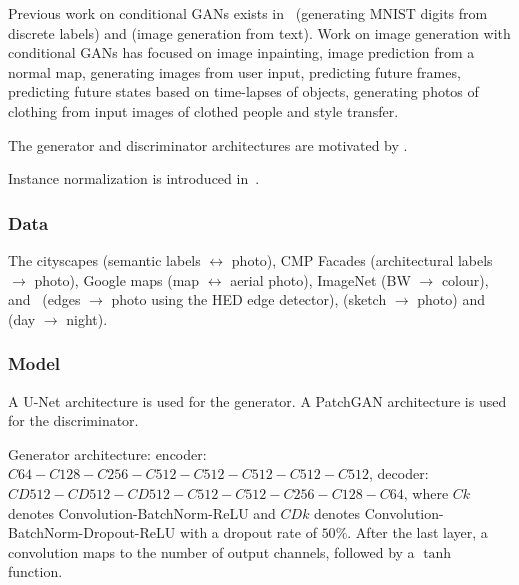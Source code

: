 \documentclass[a4paper, 12pt]{article}
\begin{document}
Previous work on conditional GANs exists in~\citet{DBLP:journals/corr/MirzaO14}
(generating MNIST digits from discrete labels) and
\citet{DBLP:journals/corr/ReedAYLSL16} (image generation from text). Work on
image generation with conditional GANs has focused on image
inpainting\citet{DBLP:journals/corr/PathakKDDE16}, image prediction from a
normal map\citet{DBLP:journals/corr/WangG16}, generating images from user
input\citet{DBLP:journals/corr/WangG16}, predicting future
frames\citet{DBLP:journals/corr/MathieuCL15}, predicting future states based on
time-lapses of objects\citet{DBLP:journals/corr/ZhouB16b}, generating photos of
clothing from input images of clothed people\citet{DBLP:journals/corr/YooKPPK16}
and style transfer\citet{DBLP:journals/corr/LiW16b}.

The generator and discriminator architectures are motivated by
\citet{DBLP:journals/corr/RadfordMC15}.

Instance normalization is introduced in~\citet{DBLP:journals/corr/UlyanovVL16}.

\subsubsection{Data}

The cityscapes\citet{Cordts_2016_CVPR} (semantic labels $\leftrightarrow$
photo), CMP Facades (architectural labels $\rightarrow$ photo), Google maps
(map $\leftrightarrow$ aerial photo),
ImageNet\citet{DBLP:journals/corr/RussakovskyDSKSMHKKBBF14} (BW $\rightarrow$
colour), \citet{zhu2016generative} and~\citet{fine-grained} (edges
$\rightarrow$ photo using the HED edge
detector\citet{DBLP:journals/corr/XieT15}),
\citet{Eitz:2012:HSO:2185520.2185540} (sketch $\rightarrow$ photo) and
\citet{Laffont14} (day $\rightarrow$ night).

\subsubsection{Model}

A U-Net\citet{DBLP:journals/corr/RonnebergerFB15} architecture is used for the
generator. A PatchGAN architecture\citet{DBLP:journals/corr/LiW16b} is used for
the discriminator.

Generator architecture: encoder: $C64-C128-C256-C512-C512-C512-C512-C512$,
decoder: $CD512-CD512-CD512-C512-C512-C256-C128-C64$, where $Ck$ denotes
Convolution-BatchNorm-ReLU and $CDk$ denotes
Convolution-BatchNorm-Dropout-ReLU with a dropout rate of $50\%$. After the
last layer, a convolution maps to the number of output channels, followed by a
$\tanh$ function.
\end{document}
